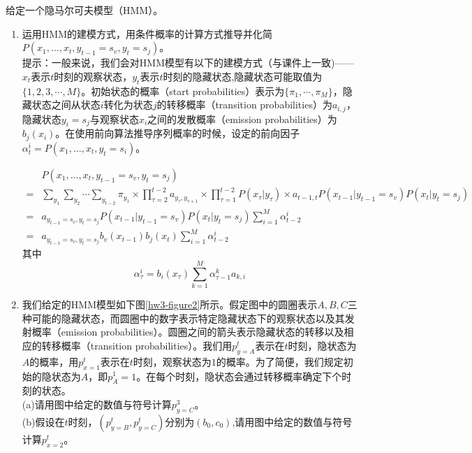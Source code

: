 \begin{problem}
\indent 给定一个隐马尔可夫模型（HMM）。
\begin{enumerate}
    \item 运用HMM的建模方式，用条件概率的计算方式推导并化简$P(x_1,...,x_t,y_{t-1}=s_v,y_t=s_j)$。\\
\indent 提示：一般来说，我们会对HMM模型有以下的建模方式（与课件上一致)——$x_t$表示$t$时刻的观察状态，$y_t$表示$t$时刻的隐藏状态,隐藏状态可能取值为$\{1,2,3,\cdots, M \}$。初始状态的概率（start probabilities）表示为$\{ \pi_1, \cdots, \pi_M\}$，隐藏状态之间从状态$i$转化为状态$j$的转移概率（transition probabilities）为$a_{i,j}$，隐藏状态$y_i=s_j$与观察状态$x_i$之间的发散概率（emission probabilities）为$b_j(x_i)$。在使用前向算法推导序列概率的时候，设定的前向因子$ \alpha_t^i=P(x_1,...,x_t,y_t=s_i)$。
\begin{solution}
    \begin{align*}
        &P(x_1,...,x_t,y_{t-1}=s_v,y_t=s_j) \\
        =& \sum_{y_1}\sum_{y_2}\cdots\sum_{y_{t-2}}\pi_{y_1}\times\prod_{\tau=2}^{t-2}a_{y_\tau,y_{\tau+1}}\times\prod_{\tau=1}^{t-2} P(x_\tau|y_\tau)\times a_{t-1,t} P(x_{t-1}|y_{t-1}=s_v) P(x_t|y_t=s_j)\\
        =& a_{y_{t-1}=s_v,y_t=s_j} P(x_{t-1}|y_{t-1}=s_v) P(x_t|y_t=s_j) \sum_{i=1}^M\alpha_{t-2}^i\\
        =& a_{y_{t-1}=s_v,y_t=s_j} b_{v}(x_{t-1})b_{j}(x_t)\sum_{i=1}^M\alpha_{t-2}^i
    \end{align*}
    其中
    \begin{equation*}
        \alpha_\tau^i = b_{i}(x_{\tau})\sum_{k=1}^M \alpha_{\tau-1}^k a_{k,i}
    \end{equation*}
\end{solution}
    \item 我们给定的HMM模型如下图\ref{hw3-figure2}所示。假定图中的圆圈表示$A, B, C$三种可能的隐藏状态，而圆圈中的数字表示特定隐藏状态下的观察状态以及其发射概率（emission probabilities）。圆圈之间的箭头表示隐藏状态的转移以及相应的转移概率（transition probabilities）。我们用$p_{y=A}^t$表示在$t$时刻，隐状态为$A$的概率，用$p_{x=1}^t$表示在$t$时刻，观察状态为$1$的概率。为了简便，我们规定初始的隐状态为$A$，即$p_A^1 = 1$。在每个时刻，隐状态会通过转移概率确定下个时刻的状态。\\
\indent (a)请用图中给定的数值与符号计算$p_{y=C}^3$。\\
\indent (b)假设在$t$时刻，$(p_{y=B}^t, p_{y=C}^t)$分别为$(b_0, c_0)$,请用图中给定的数值与符号计算$p_{x=2}^t$。

\end{enumerate}
\end{problem}

